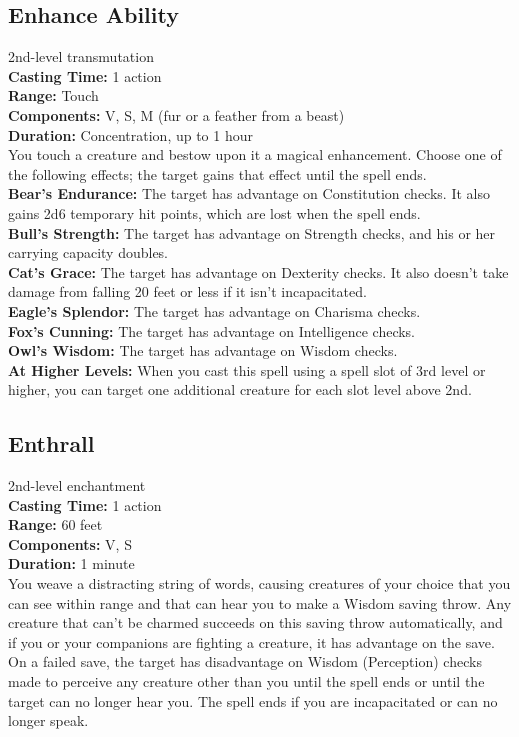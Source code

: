 \documentclass[11pt, A4paper, english]{article}
\begin{document}
		\subsection{Enhance Ability}
2nd-level transmutation \\
\textbf{Casting Time:} 1 action \\
\textbf{Range:} Touch \\
\textbf{Components:} V, S, M (fur or a feather from a beast) \\
\textbf{Duration:} Concentration, up to 1 hour \\
You touch a creature and bestow upon it a magical enhancement. Choose one of the following effects; the target gains that effect until the spell ends. \\
\textbf{Bear's Endurance:} The target has advantage on Constitution checks. It also gains 2d6 temporary hit points, which are lost when the spell ends. \\
\textbf{Bull's Strength:} The target has advantage on Strength checks, and his or her carrying capacity doubles. \\
\textbf{Cat's Grace:} The target has advantage on Dexterity checks. It also doesn’t take damage from falling 20 feet or less if it isn’t incapacitated. \\
\textbf{Eagle's Splendor:} The target has advantage on Charisma checks. \\
\textbf{Fox's Cunning:} The target has advantage on Intelligence checks. \\
\textbf{Owl's Wisdom:} The target has advantage on Wisdom checks. \\
\textbf{At Higher Levels:} When you cast this spell using a spell slot of 3rd level or higher, you can target one additional creature for each slot level above 2nd.


		\subsection{Enthrall}
2nd-level enchantment \\
\textbf{Casting Time:} 1 action \\
\textbf{Range:} 60 feet \\
\textbf{Components:} V, S \\
\textbf{Duration:} 1 minute \\
You weave a distracting string of words, causing creatures of your choice that you can see within range and that can hear you to make a Wisdom saving throw. Any creature that can’t be charmed succeeds on this saving throw automatically, and if you or your companions are fighting a creature, it has advantage on the save. On a failed save, the target has disadvantage on Wisdom (Perception) checks made to perceive any creature other than you until the spell ends or until the target can no longer hear you. The spell ends if you are incapacitated or can no longer speak.
\end{document}
